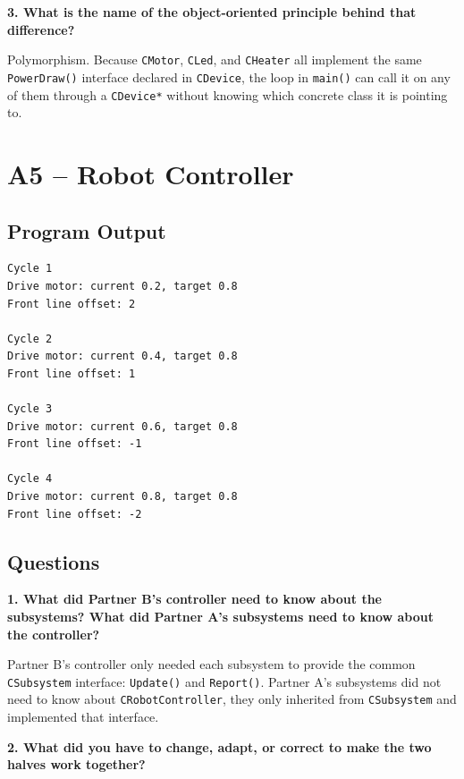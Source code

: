 \documentclass[10pt,a4paper]{article}
\newcommand{\question}[1]{%
    \vspace{5pt}
    \textbf{#1}\par
    \vspace{2pt}
}
\begin{document}
\question{3. What is the name of the object-oriented principle behind that difference?}

Polymorphism. Because \texttt{CMotor}, \texttt{CLed}, and \texttt{CHeater}
all implement the same \texttt{PowerDraw()} interface declared in
\texttt{CDevice}, the loop in \texttt{main()} can call it on any of them
through a \texttt{CDevice*} without knowing which concrete class it is
pointing to.





\newpage
\section{A5 -- Robot Controller}

\subsection{Program Output}

\begin{lstlisting}[style=output]
Cycle 1
Drive motor: current 0.2, target 0.8
Front line offset: 2

Cycle 2
Drive motor: current 0.4, target 0.8
Front line offset: 1

Cycle 3
Drive motor: current 0.6, target 0.8
Front line offset: -1

Cycle 4
Drive motor: current 0.8, target 0.8
Front line offset: -2
\end{lstlisting}

\subsection{Questions}
\question{1. What did Partner B's controller need to know about the subsystems? What did Partner A's subsystems need to know about the controller?}

Partner B's controller only needed each subsystem to provide the common
\texttt{CSubsystem} interface: \texttt{Update()} and \texttt{Report()}.
Partner A's subsystems did not need to know about \texttt{CRobotController},
they only inherited from \texttt{CSubsystem} and implemented that interface.

\question{2. What did you have to change, adapt, or correct to make the two halves work together?}
\end{document}
